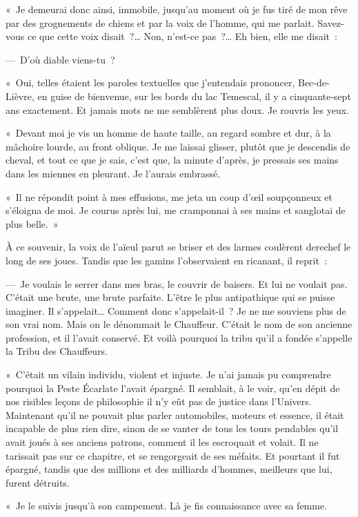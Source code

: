 \documentclass[french,twoside]{book} %
\begin{document}
« Je demeurai donc ainsi, immobile, jusqu’au moment où je fus tiré de mon rêve par des grognements de chiens et par la voix de l’homme, qui me parlait. Savez-vous ce que cette voix disait ?… Non, n’est-ce pas ?… Eh bien, elle me disait :\par
— D’où diable viens-tu ?\par
« Oui, telles étaient les paroles textuelles que j’entendais prononcer, Bec-de-Lièvre, en guise de bienvenue, sur les bords du lac Temescal, il y a cinquante-sept ans exactement. Et jamais mots ne me semblèrent plus doux. Je rouvris les yeux.\par
« Devant moi je vis un homme de haute taille, au regard sombre et dur, à la mâchoire lourde, au front oblique. Je me laissai glisser, plutôt que je descendis de cheval, et tout ce que je sais, c’est que, la minute d’après, je pressais ses mains dans les miennes en pleurant. Je l’aurais embrassé.\par
« Il ne répondit point à mes effusions, me jeta un coup d’œil soupçonneux et s’éloigna de moi. Je courus après lui, me cramponnai à ses mains et sanglotai de plus belle. »\par
À ce souvenir, la voix de l’aïeul parut se briser et des larmes coulèrent derechef le long de ses joues. Tandis que les gamins l’observaient en ricanant, il reprit :\par
— Je voulais le serrer dans mes bras, le couvrir de baisers. Et lui ne voulait pas. C’était une brute, une brute parfaite. L’être le plus antipathique qui se puisse imaginer. Il s’appelait… Comment donc s’appelait-il ? Je ne me souviens plus de son vrai nom. Mais on le dénommait le Chauffeur. C’était le nom de son ancienne profession, et il l’avait conservé. Et voilà pourquoi la tribu qu’il a fondée s’appelle la Tribu des Chauffeurs.\par
« C’était un vilain individu, violent et injuste. Je n’ai jamais pu comprendre pourquoi la Peste Écarlate l’avait épargné. Il semblait, à le voir, qu’en dépit de nos risibles leçons de philosophie il n’y eût pas de justice dans l’Univers. Maintenant qu’il ne pouvait plus parler automobiles, moteurs et essence, il était incapable de plus rien dire, sinon de se vanter de tous les tours pendables qu’il avait joués à ses anciens patrons, comment il les escroquait et volait. Il ne tarissait pas sur ce chapitre, et se rengorgeait de ses méfaits. Et pourtant il fut épargné, tandis que des millions et des milliards d’hommes, meilleurs que lui, furent détruits.\par
« Je le suivis jusqu’à son campement. Là je fis connaissance avec sa femme.\par
\end{document}

